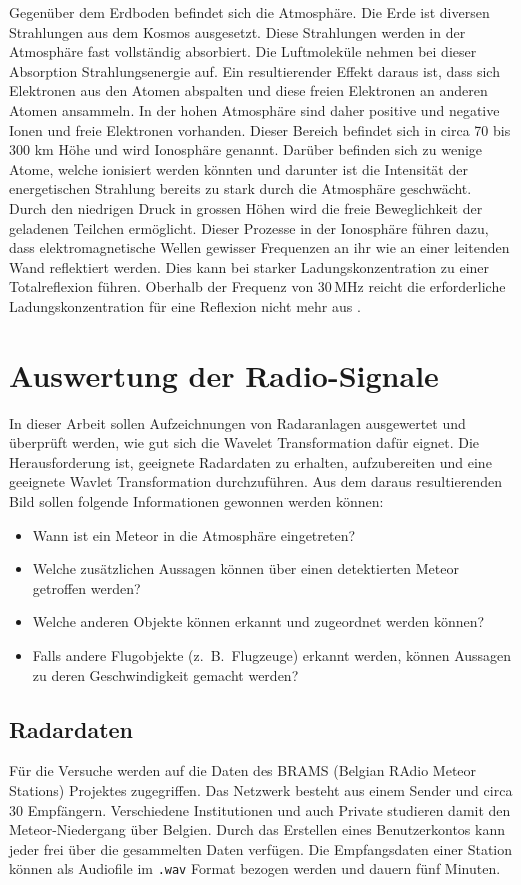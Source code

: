 \begin{refsection}
Gegenüber dem Erdboden befindet sich die Atmosphäre.
Die Erde ist diversen Strahlungen aus dem Kosmos ausgesetzt.
Diese Strahlungen werden in der Atmosphäre fast vollständig absorbiert.
Die Luftmoleküle nehmen bei dieser Absorption Strahlungsenergie auf.
Ein resultierender Effekt daraus ist, dass sich Elektronen aus den Atomen abspalten und diese freien Elektronen an anderen Atomen ansammeln.
In der hohen Atmosphäre sind daher positive und negative Ionen und freie Elektronen vorhanden.
Dieser Bereich befindet sich in circa 70 bis 300 km Höhe und wird Ionosphäre genannt.
%
Darüber befinden sich zu wenige Atome, welche ionisiert werden könnten und darunter ist die Intensität der energetischen Strahlung bereits zu stark durch die Atmosphäre geschwächt.
Durch den niedrigen Druck in grossen Höhen wird die freie Beweglichkeit der geladenen Teilchen ermöglicht.
Dieser Prozesse in der Ionosphäre führen dazu, dass elektromagnetische Wellen gewisser Frequenzen an ihr wie an einer leitenden Wand reflektiert werden.
Dies kann bei starker Ladungskonzentration zu einer Totalreflexion führen. 
Oberhalb der Frequenz von 30\,MHz reicht die erforderliche Ladungskonzentration für eine Reflexion nicht mehr aus \cite{buch:meinke}.


\section{Auswertung der Radio-Signale}

In dieser Arbeit sollen Aufzeichnungen von Radaranlagen ausgewertet und überprüft werden, wie gut sich die Wavelet Transformation dafür eignet.
Die Herausforderung ist, geeignete Radardaten zu erhalten, aufzubereiten und eine geeignete Wavlet Transformation durchzuführen.
Aus dem daraus resultierenden Bild sollen folgende Informationen gewonnen werden können:
\begin{itemize}
	\item Wann ist ein Meteor in die Atmosphäre eingetreten?
	\item Welche zusätzlichen Aussagen können über einen detektierten Meteor getroffen werden?
	\item Welche anderen Objekte können erkannt und zugeordnet werden können?
	\item Falls andere Flugobjekte (z.~B.~Flugzeuge) erkannt werden, können Aussagen zu deren Geschwindigkeit gemacht werden?
\end{itemize}

\subsection{Radardaten}
Für die Versuche werden auf die Daten des BRAMS (Belgian RAdio Meteor Stations) Projektes zugegriffen.
%
%
Das Netzwerk besteht aus einem Sender und circa 30 Empfängern.
Verschiedene Institutionen und auch Private studieren damit den Meteor-Niedergang über Belgien.
Durch das Erstellen eines Benutzerkontos kann jeder frei über die gesammelten Daten verfügen.
Die Empfangsdaten einer Station können als Audiofile im \texttt{.wav} Format bezogen werden und dauern fünf Minuten.


\end{refsection}
